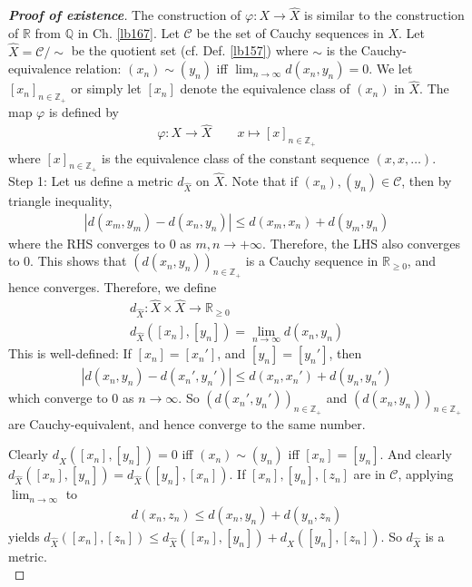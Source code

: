 \documentclass[12pt,b5paper,notitlepage]{article}
\theoremstyle{definition}
\theoremstyle{plain}
\newcommand{\wht}{\widehat}
\newcommand{\scr}{\mathscr}
\newcommand{\Zbb}{\mathbb Z}
\newcommand{\Qbb}{\mathbb Q}
\newcommand{\Rbb}{\mathbb R}
\numberwithin{equation}{section}
\begin{document}
\begin{proof}[\textbf{Proof of existence}]
The construction of $\varphi:X\rightarrow\wht X$ is similar to the construction of $\Rbb$ from $\Qbb$ in Ch. \ref{lb167}. Let $\scr C$ be the set of Cauchy sequences in $X$. Let $\wht X=\scr C/\sim$ be the quotient set (cf. Def. \ref{lb157}) where $\sim$ is the Cauchy-equivalence relation: $(x_n)\sim(y_n)$ iff $\lim_{n\rightarrow\infty}d(x_n,y_n)=0$. We let $[x_n]_{n\in\Zbb_+}$ or simply let $[x_n]$ denote the equivalence class of $(x_n)$ in $\wht X$. The map $\varphi$ is defined by
\begin{align*}
\varphi:X\rightarrow\wht X\qquad x\mapsto [x]_{n\in\Zbb_+}
\end{align*}
where $[x]_{n\in\Zbb_+}$ is the equivalence class of the constant sequence $(x,x,\dots)$.\\[-0.5ex]


Step 1: Let us define a metric $d_{\wht X}$ on $\wht X$. Note that if $(x_n),(y_n)\in \scr C$, then by triangle inequality,
\begin{align*}
|d(x_m,y_m)-d(x_n,y_n)|\leq d(x_m,x_n)+d(y_m,y_n)
\end{align*}
where the RHS converges to $0$ as $m,n\rightarrow+\infty$. Therefore, the LHS also converges to $0$. This shows that $(d(x_n,y_n))_{n\in\Zbb_+}$ is a Cauchy sequence in $\Rbb_{\geq0}$, and hence converges. Therefore, we define
\begin{gather*}
d_{\wht X}:\wht X\times \wht X\rightarrow\Rbb_{\geq0}\\
d_{\wht X}([x_n],[y_n])=\lim_{n\rightarrow\infty}d(x_n,y_n)
\end{gather*}
This is well-defined: If $[x_n]=[x_n']$, and $[y_n]=[y_n']$, then 
\begin{align*}
|d(x_n,y_n)-d(x_n',y_n')|\leq d(x_n,x_n')+d(y_n,y_n')
\end{align*}
which converge to $0$ as $n\rightarrow\infty$. So $(d(x_n',y_n'))_{n\in\Zbb_+}$ and $(d(x_n,y_n))_{n\in\Zbb_+}$ are Cauchy-equivalent, and hence converge to the same number.

Clearly $d_{\wht X}([x_n],[y_n])=0$ iff $(x_n)\sim (y_n)$ iff $[x_n]=[y_n]$. And clearly $d_{\wht X}([x_n],[y_n])=d_{\wht X}([y_n],[x_n])$. If $[x_n],[y_n],[z_n]$ are in $\scr C$, applying $\lim_{n\rightarrow\infty}$ to
\begin{align*}
d(x_n,z_n)\leq d(x_n,y_n)+d(y_n,z_n)
\end{align*}
yields $d_{\wht X}([x_n],[z_n])\leq d_{\wht X}([x_n],[y_n])+d_{\wht X}([y_n],[z_n])$. So $d_{\wht X}$ is a metric.\\[-0.5ex]


\end{proof}
\end{document}
